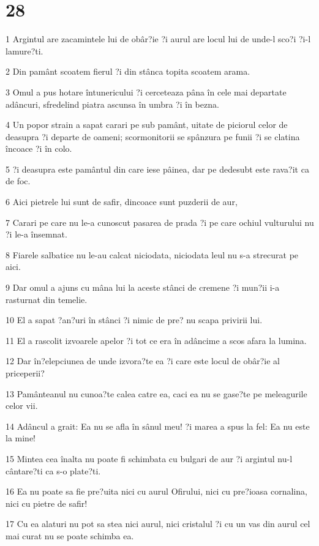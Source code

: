 \chapter{28}

\par 1 Argintul are zacamintele lui de obâr?ie ?i aurul are locul lui de unde-l sco?i ?i-l lamure?ti.
\par 2 Din pamânt scoatem fierul ?i din stânca topita scoatem arama.
\par 3 Omul a pus hotare întunericului ?i cerceteaza pâna în cele mai departate adâncuri, sfredelind piatra ascunsa în umbra ?i în bezna.
\par 4 Un popor strain a sapat carari pe sub pamânt, uitate de piciorul celor de deasupra ?i departe de oameni; scormonitorii se spânzura pe funii ?i se clatina încoace ?i în colo.
\par 5 ?i deasupra este pamântul din care iese pâinea, dar pe dedesubt este rava?it ca de foc.
\par 6 Aici pietrele lui sunt de safir, dincoace sunt puzderii de aur,
\par 7 Carari pe care nu le-a cunoscut pasarea de prada ?i pe care ochiul vulturului nu ?i le-a însemnat.
\par 8 Fiarele salbatice nu le-au calcat niciodata, niciodata leul nu s-a strecurat pe aici.
\par 9 Dar omul a ajuns cu mâna lui la aceste stânci de cremene ?i mun?ii i-a rasturnat din temelie.
\par 10 El a sapat ?an?uri în stânci ?i nimic de pre? nu scapa privirii lui.
\par 11 El a rascolit izvoarele apelor ?i tot ce era în adâncime a scos afara la lumina.
\par 12 Dar în?elepciunea de unde izvora?te ea ?i care este locul de obâr?ie al priceperii?
\par 13 Pamânteanul nu cunoa?te calea catre ea, caci ea nu se gase?te pe meleagurile celor vii.
\par 14 Adâncul a grait: Ea nu se afla în sânul meu! ?i marea a spus la fel: Ea nu este la mine!
\par 15 Mintea cea înalta nu poate fi schimbata cu bulgari de aur ?i argintul nu-l cântare?ti ca s-o plate?ti.
\par 16 Ea nu poate sa fie pre?uita nici cu aurul Ofirului, nici cu pre?ioasa cornalina, nici cu pietre de safir!
\par 17 Cu ea alaturi nu pot sa stea nici aurul, nici cristalul ?i cu un vas din aurul cel mai curat nu se poate schimba ea.
